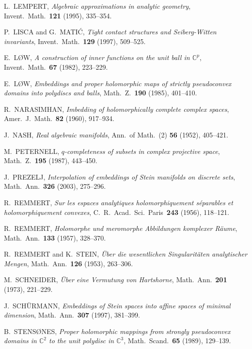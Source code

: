 \documentclass[11pt]{amsart}
\numberwithin{equation}{section}
\theoremstyle{definition}
\begin{document}
\begin{thebibliography}{10}
L.\ LEMPERT, 
\textit{Algebraic approximations in analytic geometry}, 
Invent.\ Math.\ \textbf{121} (1995), 335--354.

P.\ LISCA and G.\ MATI\'C, 
\textit{Tight contact structures and Seiberg-Witten invariants}, 
Invent.\ Math.\ \textbf{129} (1997), 509--525. 

E.\ L\O W,
\textit{A construction of inner functions on the unit ball in ${\mathbb{C}}^p$},
Invent.\ Math.\ \textbf{67} (1982), 223--229. 

E.\ L\O W,
\textit{Embeddings and proper holomorphic maps of strictly pseudoconvex domains 
into polydiscs and balls}, 
Math.\ Z.\ \textbf{190} (1985), 401--410. 

R.\ NARASIMHAN, 
\textit{Imbedding of holomorphically complete complex spa\-ces},  
Amer.\ J.\ Math.\ \textbf{82} (1960), 917--934. 

J.\ NASH, 
\textit{Real algebraic manifolds},
Ann.\ of Math.\ (2) \textbf{56} (1952), 405--421. 

M.\ PETERNELL, 
\textit{$q$-completeness of subsets in complex projective space}, 
Math.\ Z.\ \textbf{195} (1987), 443--450.

J.\ PREZELJ, 
\textit{Interpolation of embeddings of Stein manifolds on discrete sets},
Math.\ Ann.\ \textbf{326} (2003), 275--296. 

R.\ REMMERT, 
\textit{Sur les espaces analytiques holomorphiquement s\'epa\-rab\-les et
holomorphiquement convexes}, 
C.\ R.\ Acad.\ Sci.\ Paris\ \textbf{243} (1956), 118--121. 

R.\ REMMERT, 
\textit{Holomorphe und meromorphe Abbildungen komplexer R\"aume}, 
Math.\ Ann.\ \textbf{133} (1957), 328--370. 

R.\ REMMERT and K.\ STEIN, 
\textit{\"Uber die wesentlichen Singularit\"aten analytischer Mengen}, 
Math.\ Ann.\ \textbf{126} (1953), 263--306.

M.\ SCHNEIDER, 
\textit{\"Uber eine Vermutung von Hartshorne}, 
Math.\ Ann.\ \textbf{201} (1973), 221--229. 

J.\ SCH\"URMANN, 
\textit{Embeddings of Stein spaces into affine spaces of minimal dimension}, 
Math.\ Ann.\ \textbf{307} (1997), 381--399. 

B.\ STENS\O NES,
\textit{Proper holomorphic mappings from strongly pseudoconvex domains 
in ${\mathbb{C}}^2$ to the unit polydisc in ${\mathbb{C}}^3$}, 
Math.\ Scand.\ \textbf{65} (1989), 129--139.


\end{thebibliography}
\end{document}
